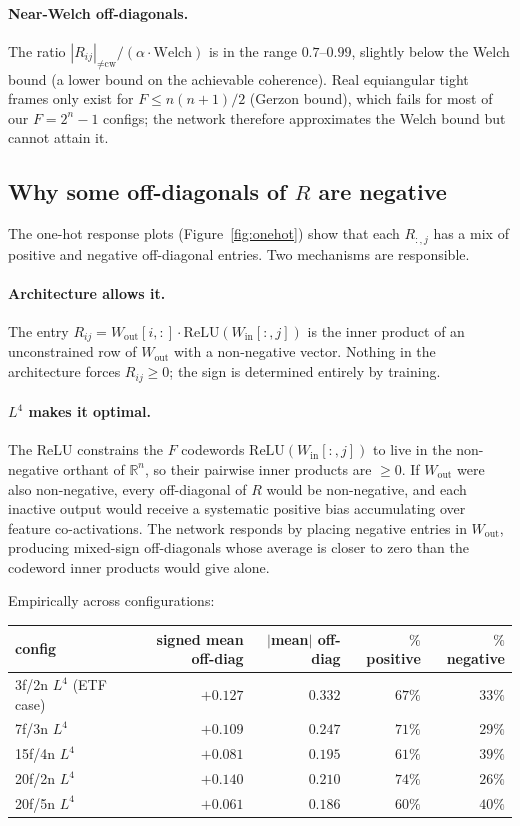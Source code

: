 \documentclass[11pt]{article}
\begin{document}
\paragraph{Near-Welch off-diagonals.} The ratio
$|R_{ij}|_{\neq\text{cw}} / (\alpha \cdot \mathrm{Welch})$ is in the range
$0.7\text{--}0.99$, slightly below the Welch bound (a lower bound on the
achievable coherence). Real equiangular tight frames only exist for
$F \le n(n+1)/2$ (Gerzon bound), which fails for most of our
$F = 2^n - 1$ configs; the network therefore approximates the Welch bound
but cannot attain it.

\subsection{Why some off-diagonals of $R$ are negative}

The one-hot response plots (Figure~\ref{fig:onehot}) show that each
$R_{:,j}$ has a mix of positive and negative off-diagonal entries. Two
mechanisms are responsible.

\paragraph{Architecture allows it.} The entry
$R_{ij} = W_{\mathrm{out}}[i, :]\cdot\mathrm{ReLU}(W_{\mathrm{in}}[:, j])$
is the inner product of an unconstrained row of $W_{\mathrm{out}}$ with a
non-negative vector. Nothing in the architecture forces $R_{ij} \ge 0$;
the sign is determined entirely by training.

\paragraph{$L^4$ makes it optimal.} The ReLU constrains the $F$
codewords $\mathrm{ReLU}(W_{\mathrm{in}}[:,j])$ to live in the non-negative
orthant of $\mathbb{R}^n$, so their pairwise inner products are $\ge 0$.
If $W_{\mathrm{out}}$ were also non-negative, every off-diagonal of $R$
would be non-negative, and each inactive output would receive a
systematic positive bias accumulating over feature co-activations. The
network responds by placing negative entries in $W_{\mathrm{out}}$,
producing mixed-sign off-diagonals whose average is closer to zero than
the codeword inner products would give alone.

Empirically across configurations:

\begin{center}
\begin{tabular}{lrrrr}
\toprule
config & signed mean off-diag & $|$mean$|$ off-diag & $\%$ positive & $\%$ negative \\
\midrule
3f/2n $L^4$ (ETF case) & $+0.127$ & $0.332$ & $67\%$ & $33\%$ \\
7f/3n $L^4$ & $+0.109$ & $0.247$ & $71\%$ & $29\%$ \\
15f/4n $L^4$ & $+0.081$ & $0.195$ & $61\%$ & $39\%$ \\
20f/2n $L^4$ & $+0.140$ & $0.210$ & $74\%$ & $26\%$ \\
20f/5n $L^4$ & $+0.061$ & $0.186$ & $60\%$ & $40\%$ \\
\bottomrule
\end{tabular}
\end{center}
\end{document}
